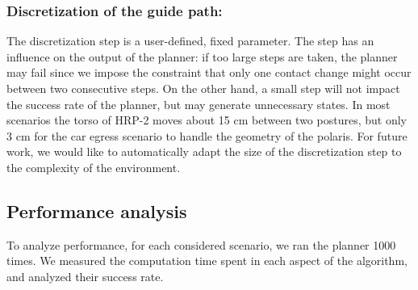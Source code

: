 \subsubsection{Discretization of the guide path:} \label{sec:disc}
The discretization step is a user-defined, fixed parameter. The step
has an influence on the output of the planner: if too large steps are taken,
the planner may fail since we impose the constraint that only one contact change might occur
between two consecutive steps. On the other hand, a small step will not impact the success rate of the planner, 
but may generate unnecessary states. In most scenarios the torso of HRP-2 moves about 15 cm between two postures, but only 3 cm
for the car egress scenario to handle the geometry of the polaris.
For future work, we would like to automatically adapt the size of the discretization step to the complexity of the environment.

\subsection{Performance analysis} \label{sec:perf}
To analyze performance, for each considered scenario, we ran the planner 1000 times.
We measured the computation time spent in each aspect of the algorithm, and analyzed their success rate.


